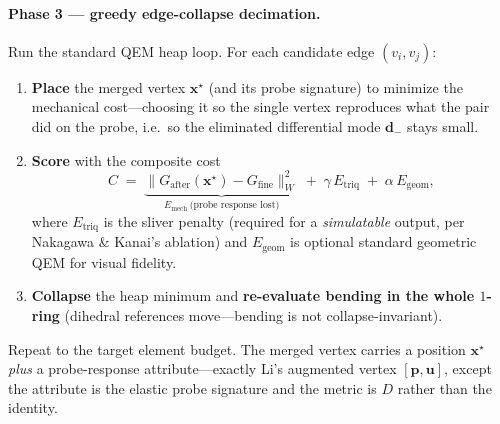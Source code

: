 \paragraph{Phase 3 --- greedy edge-collapse decimation.}
Run the standard QEM heap loop.
For each candidate edge $(v_i, v_j)$:
\begin{enumerate}
  \item \textbf{Place} the merged vertex $\mathbf{x}^\star$ (and its probe signature) to minimize the mechanical cost---choosing it so the single vertex reproduces what the pair did on the probe, i.e.\ so the eliminated differential mode $\mathbf{d}_-$ stays small.
  \item \textbf{Score} with the composite cost
        \begin{equation}
          C \;=\; \underbrace{\big\|G_{\text{after}}(\mathbf{x}^\star) - G_{\text{fine}}\big\|_W^2}_{E_{\text{mech}}\ \text{(probe response lost)}}
            \;+\; \gamma\,E_{\text{triq}} \;+\; \alpha\,E_{\text{geom}},
        \end{equation}
        where $E_{\text{triq}}$ is the sliver penalty (required for a \emph{simulatable} output, per Nakagawa \& Kanai's ablation) and $E_{\text{geom}}$ is optional standard geometric QEM for visual fidelity.
  \item \textbf{Collapse} the heap minimum and \textbf{re-evaluate bending in the whole $1$-ring} (dihedral references move---bending is not collapse-invariant).
\end{enumerate}
Repeat to the target element budget.
The merged vertex carries a position $\mathbf{x}^\star$ \emph{plus} a probe-response attribute---exactly Li's augmented vertex $[\mathbf{p},\mathbf{u}]$, except the attribute is the elastic probe signature and the metric is $D$ rather than the identity.

